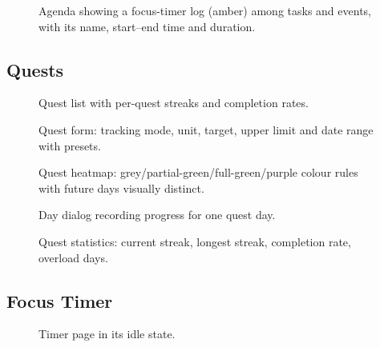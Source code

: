\documentclass[12pt,a4paper]{article}
\begin{document}
\begin{figure}[H]
  \centering
  \caption{Agenda showing a focus-timer log (amber) among tasks and events,
  with its name, start--end time and duration.}
\end{figure}

\subsection{Quests}

\begin{figure}[H]
  \centering
  \caption{Quest list with per-quest streaks and completion rates.}
\end{figure}

\begin{figure}[H]
  \centering
  \caption{Quest form: tracking mode, unit, target, upper limit and date
  range with presets.}
\end{figure}

\begin{figure}[H]
  \centering
  \caption{Quest heatmap: grey/partial-green/full-green/purple colour rules
  with future days visually distinct.}
\end{figure}

\begin{figure}[H]
  \centering
  \caption{Day dialog recording progress for one quest day.}
\end{figure}

\begin{figure}[H]
  \centering
  \caption{Quest statistics: current streak, longest streak, completion
  rate, overload days.}
\end{figure}

\subsection{Focus Timer}

\begin{figure}[H]
  \centering
  \caption{Timer page in its idle state.}
\end{figure}
\end{document}
